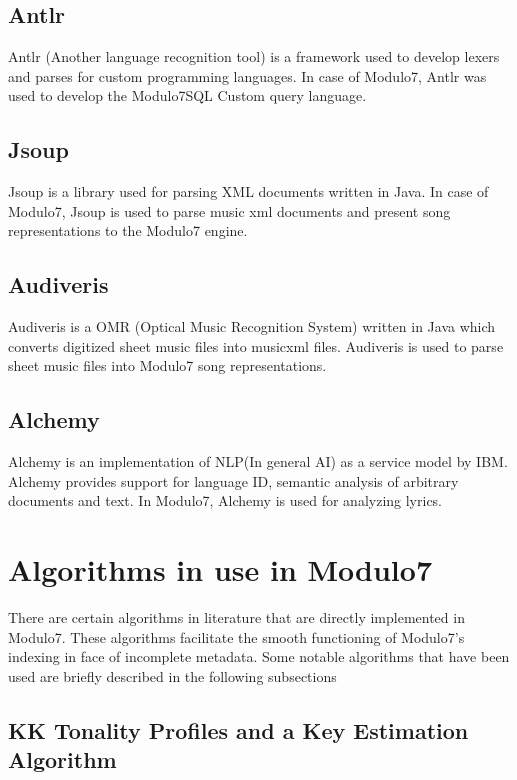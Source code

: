 \section{Antlr}

\noindent Antlr (Another language recognition tool) is a framework used to develop lexers and parses for custom programming languages. In case of Modulo7, Antlr was used to develop the Modulo7SQL Custom query language.

\section{Jsoup}

\noindent Jsoup is a library used for parsing XML documents written in Java. In case of Modulo7, Jsoup is used to parse music xml documents and present song representations to the Modulo7 engine. 

\section{Audiveris}

\noindent Audiveris is a OMR (Optical Music Recognition System) written in Java which converts digitized sheet music files into musicxml files. Audiveris is used to parse sheet music files into Modulo7 song representations.

\section{Alchemy} \label{Alchemy}

\noindent Alchemy is an implementation of NLP(In general AI) as a service model by IBM. Alchemy provides support for language ID, semantic analysis of arbitrary documents and text. In Modulo7, Alchemy is used for analyzing lyrics.  

\chapter{Algorithms in use in Modulo7}

\noindent There are certain algorithms in literature that are directly implemented in Modulo7. These algorithms facilitate the smooth functioning of Modulo7's indexing in face of incomplete metadata. Some notable algorithms that have been used are briefly described in the following subsections

\section{KK Tonality Profiles and a Key Estimation Algorithm} \label{kktonality}

